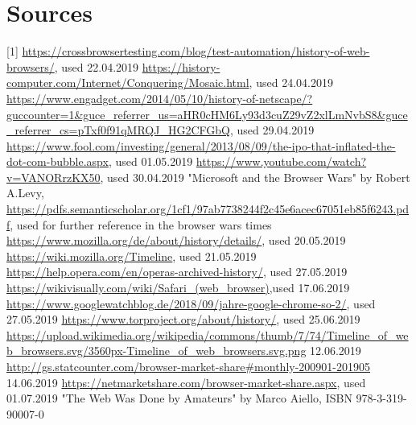 \documentclass[runningheads]{llncs}
\begin{document}
	\section{Sources}
	[1] \url{https://crossbrowsertesting.com/blog/test-automation/history-of-web-browsers/}, used 22.04.2019
	\newline
	[2] \url{https://history-computer.com/Internet/Conquering/Mosaic.html}, used 24.04.2019
	\newline
	[3] \url{https://www.engadget.com/2014/05/10/history-of-netscape/?guccounter=1&guce_referrer_us=aHR0cHM6Ly93d3cuZ29vZ2xlLmNvbS8&guce_referrer_cs=pTxf0f91qMRQJ_HG2CFGbQ}, used 29.04.2019
	\newline
	[4] \url{https://www.fool.com/investing/general/2013/08/09/the-ipo-that-inflated-the-dot-com-bubble.aspx}, used 01.05.2019
	\newline
	[5] \url{https://www.youtube.com/watch?v=VANORrzKX50}, used 30.04.2019
	\newline
	[6] "Microsoft and the Browser Wars" by Robert A.Levy, \url{https://pdfs.semanticscholar.org/1cf1/97ab7738244f2c45e6acec67051eb85f6243.pdf}, used for further reference in the browser wars times
	\newline
	[7] \url{https://www.mozilla.org/de/about/history/details/}, used 20.05.2019
	\newline
	[8] \url{https://wiki.mozilla.org/Timeline}, used 21.05.2019
	\newline
	[9] \url{
		https://help.opera.com/en/operas-archived-history/}, used 27.05.2019
	\newline
	[10] \url{
		https://wikivisually.com/wiki/Safari_(web_browser)},used 17.06.2019
	\newline
	[11] \url{
		https://www.googlewatchblog.de/2018/09/jahre-google-chrome-so-2/}, used 27.05.2019
	\newline
	[12] \url{https://www.torproject.org/about/history/}, used 25.06.2019
	\newline
	[13]\url{https://upload.wikimedia.org/wikipedia/commons/thumb/7/74/Timeline_of_web_browsers.svg/3560px-Timeline_of_web_browsers.svg.png} 12.06.2019
	\newline
	[14] \url{http://gs.statcounter.com/browser-market-share#monthly-200901-201905} 14.06.2019
	\newline
	[15] \url{https://netmarketshare.com/browser-market-share.aspx}, used 01.07.2019
	\newline
	[16] "The Web Was Done by Amateurs" by Marco Aiello, ISBN 978-3-319-90007-0 
	\newline
\end{document}
